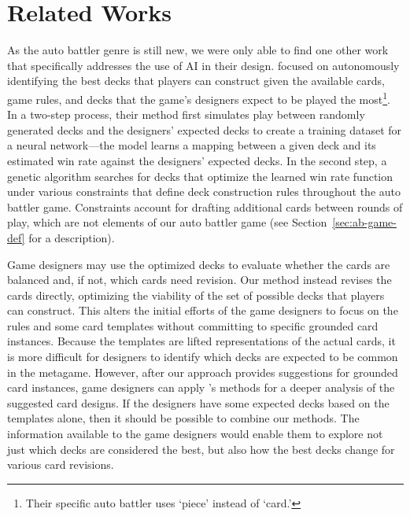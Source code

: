\documentclass[letterpaper]{article} %
\begin{document}
\section{Related Works}
As the auto battler genre is still new, we were only able to find one other work
that specifically addresses the use of AI in their design.  \citeauthor{tencent_autobattle_lineup}
 focused on autonomously identifying the
best decks that players can construct given the available cards, game rules, and
decks that the game's designers expect to be played the most\footnote{Their specific auto battler %
uses `piece' instead of `card.'}. %
In a two-step process,
their method first simulates play between randomly generated decks and the designers'
expected decks to create a training dataset for a neural network---the model
learns a mapping between a given deck and its estimated win rate against the
designers' expected decks.  In the second step, a genetic algorithm searches for
decks that optimize the learned win rate function under various constraints that
define deck construction rules throughout the auto battler game.  Constraints
account for drafting additional cards between rounds of play,
which are not elements of
our auto battler game (see Section~\ref{sec:ab-game-def} for a description).

Game designers may use the optimized decks %
to evaluate whether the cards are balanced and, if not, which
cards need revision.  Our method instead revises the cards directly, optimizing
the viability of the set of possible decks that players can construct.  This alters
the initial efforts of the game designers to focus on the rules and some card templates
without committing to specific grounded card instances.  Because the templates are
lifted representations of the actual %
cards, it is more difficult for designers
to identify which decks are expected to be common in the metagame.  However, after
our approach provides suggestions for grounded card instances, game designers
can apply \citeauthor{tencent_autobattle_lineup}'s methods for a deeper analysis
of the suggested card designs.  If the designers have some expected decks based
on the templates alone, then it should be possible to combine our methods. %
The information available to the game
designers would enable them to explore not just which decks are considered the
best, %
but also how the best decks change for various card
revisions.
\end{document}
